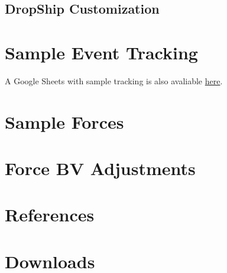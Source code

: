 \documentclass{article}
\newcommand{\mysectiontitle}{}
\newcommand{\newsection}[2]{\renewcommand{\mysectiontitle}{#2}\section{#1}}
\begin{document}


\subsection{DropShip Customization}



\newpage

\newsection{Sample Event Tracking}{sample-tracking-event}
\label{sec:sample_tracking_event}

A Google Sheets with sample tracking is also avaliable \href{https://docs.google.com/spreadsheets/d/17bFS4qAbdIUJQ173NxxHDCCGLD_BG0LDdHGekpoF5M0/copy}{here}.



\newpage

\newsection{Sample Forces}{sample-tracking}
\label{sec:sample_forces}



\newpage

\newsection{Force BV Adjustments}{bv-adjustments}
\label{sec:force_bv_adjustments}



\newpage

\newsection{References}{references}
\label{sec:references}



\newpage

\newsection{Downloads}{downloads}
\label{sec:downloads}



\newpage
\end{document}
